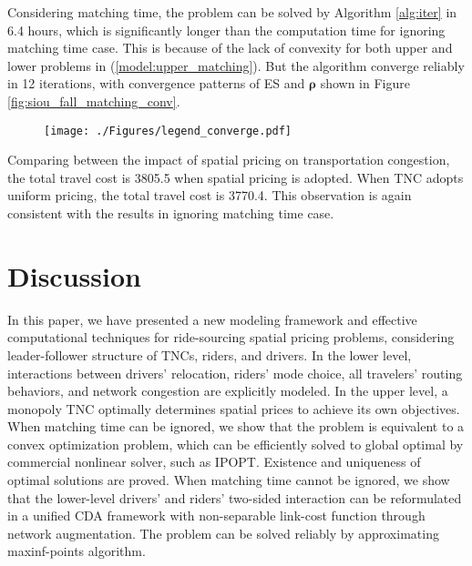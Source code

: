 \documentclass[review]{elsarticle}
\begin{document}
Considering matching time, the problem can be solved by Algorithm \ref{alg:iter} in 6.4 hours, which is significantly longer than the computation time for ignoring matching time case. This is because of the lack of convexity for both upper and lower problems in (\ref{model:upper_matching}). But the algorithm converge reliably in 12 iterations, with convergence patterns of ES and $\bm{\rho}$ shown in Figure \ref{fig:siou_fall_matching_conv}.
\begin{figure*}[htbp]
	\centering
	\begin{subfigure}[t]{0.8\linewidth}
			\centering
			\vspace{-0.5cm}
			\texttt{[image: ./Figures/legend\_converge.pdf]} 
			\label{fig:legend_compare}
	\end{subfigure}
	\vspace{-2em}
	\caption{Convergence of ES and $\bm{\rho}$ Considering Matching Time}
	\label{fig:siou_fall_matching_conv}
\end{figure*}

Comparing between the impact of spatial pricing on transportation congestion, the total travel cost is 3805.5 when spatial pricing is adopted. When TNC adopts uniform pricing, the total travel cost is 3770.4. This observation is again consistent with the results in ignoring matching time case. 


\section{Discussion}

In this paper, we have presented a new modeling framework and effective computational techniques for ride-sourcing spatial pricing problems, considering leader-follower structure of TNCs, riders, and drivers. In the lower level, interactions between drivers’ relocation, riders' mode choice, all travelers' routing behaviors, and network congestion are explicitly modeled. In the upper level, a monopoly TNC optimally determines spatial prices to achieve its own objectives. When matching time can be ignored, we show that the problem is equivalent to a convex optimization problem, which can be efficiently solved to global optimal by commercial nonlinear solver, such as IPOPT. Existence and uniqueness of optimal solutions are proved. When matching time cannot be ignored, we show that the lower-level drivers' and riders' two-sided interaction can be reformulated in a unified CDA framework with non-separable link-cost function through network augmentation. The problem can be solved reliably by approximating maxinf-points algorithm. 
\end{document}
